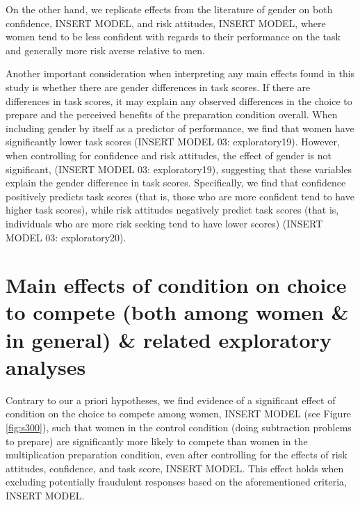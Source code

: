 \documentclass[a4paper, nobind]{templates/ociamthesis}
\begin{document}
On the other hand, we replicate effects from the literature of gender on both confidence, INSERT MODEL, and risk attitudes, INSERT MODEL, where women tend to be less confident with regards to their performance on the task and generally more risk averse relative to men.

Another important consideration when interpreting any main effects found in this study is whether there are gender differences in task scores. If there are differences in task scores, it may explain any observed differences in the choice to prepare and the perceived benefits of the preparation condition overall. When including gender by itself as a predictor of performance, we find that women have significantly lower task scores (INSERT MODEL 03: exploratory19). However, when controlling for confidence and risk attitudes, the effect of gender is not significant, (INSERT MODEL 03: exploratory19), suggesting that these variables explain the gender difference in task scores. Specifically, we find that confidence positively predicts task scores (that is, those who are more confident tend to have higher task scores), while risk attitudes negatively predict task scores (that is, individuals who are more risk seeking tend to have lower scores) (INSERT MODEL 03: exploratory20).

\hypertarget{main-effects-of-condition-on-choice-to-compete-both-among-women-in-general-related-exploratory-analyses}{%
\section{Main effects of condition on choice to compete (both among women \& in general) \& related exploratory analyses}\label{main-effects-of-condition-on-choice-to-compete-both-among-women-in-general-related-exploratory-analyses}}

Contrary to our a priori hypotheses, we find evidence of a significant effect of condition on the choice to compete among women, INSERT MODEL (see Figure \ref{fig:s300}), such that women in the control condition (doing subtraction problems to prepare) are significantly more likely to compete than women in the multiplication preparation condition, even after controlling for the effects of risk attitudes, confidence, and task score, INSERT MODEL. This effect holds when excluding potentially fraudulent responses based on the aforementioned criteria, INSERT MODEL.
\end{document}
